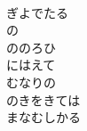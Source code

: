 \documentclass[10pt,b5j]{tarticle} %
\begin{document}
\begin{enumerate}
\begin{minipage}[c]{\blocksize}
        \vspace{\linespace}
        \item~\\
        ぎよでたる\\
        の\\
        ののろひ\\
        にはえて\\
        むなりの\\
        のきをきては\\
        まなむしかる
    
    \end{minipage}
\end{enumerate} %
\end{document}
